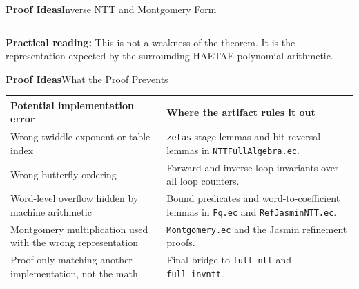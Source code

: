 \documentclass[10pt,aspectratio=1610,compress,dvipsnames]{beamer}
\newcommand{\ec}[1]{\texttt{#1}}
\begin{document}
\begin{frame}{\bfseries Proof Ideas}{Inverse NTT and Montgomery Form}
\begin{columns}[T]

\end{columns}

\vspace{4pt}
\begin{center}
\small\textbf{Practical reading:}
This is not a weakness of the theorem.  It is the representation expected by
the surrounding HAETAE polynomial arithmetic.
\end{center}
\end{frame}

\begin{frame}{\bfseries Proof Ideas}{What the Proof Prevents}
\begin{center}
\renewcommand{\arraystretch}{1.35}
\begin{tabular}{p{5.2cm}p{7.2cm}}
\toprule[1.2pt]
\textbf{Potential implementation error} & \textbf{Where the artifact rules it out} \\
\midrule
Wrong twiddle exponent or table index & \ec{zetas} stage lemmas and bit-reversal lemmas in \ec{NTTFullAlgebra.ec}. \\
Wrong butterfly ordering & Forward and inverse loop invariants over all loop counters. \\
Word-level overflow hidden by machine arithmetic & Bound predicates and word-to-coefficient lemmas in \ec{Fq.ec} and \ec{RefJasminNTT.ec}. \\
Montgomery multiplication used with the wrong representation & \ec{Montgomery.ec} and the Jasmin refinement proofs. \\
Proof only matching another implementation, not the math & Final bridge to \ec{full\_ntt} and \ec{full\_invntt}. \\
\bottomrule[1.2pt]
\end{tabular}
\end{center}
\end{frame}
\end{document}
